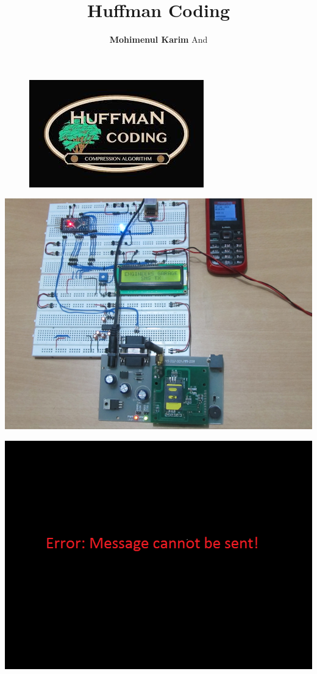 \documentclass[12pt]{beamer}
\author{{\textbf{Mohimenul Karim}} \newline And \newline {\textbf{Ankur Lahiry}}}
\title{Huffman Coding}
\begin{document}
	
\begin{figure}
\includegraphics[scale=1.1]{images}
\end{figure}


\begin{frame}
\titlepage
\end{frame}

\begin{frame}
		\includegraphics[scale=0.4]{Circuit}
\end{frame}



\begin{frame}
		\includegraphics[scale=0.6]{error}
\end{frame}
\end{document}
